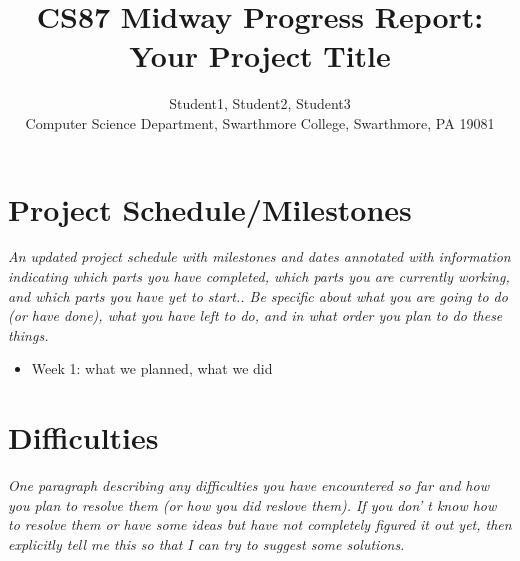 \documentclass[11pt]{article}
\begin{document}
\title{CS87 Midway Progress Report: Your Project Title}

\author{Student1, Student2, Student3 \\
Computer Science Department, Swarthmore College, Swarthmore, PA  19081}

\maketitle

\section{Project Schedule/Milestones}

{\it
An updated project schedule with milestones and dates annotated with
information indicating which parts you have completed, which parts you are
currently working, and which parts you have yet to start.. Be specific about
what you are going to do (or have done), what you have left to do, and in what
order you plan to do these things.}

\begin{itemize}
\item Week 1: what we planned, what we did
\end{itemize}

\section {Difficulties}
{\it
One paragraph describing any difficulties you have encountered so far and how
you plan to resolve them (or how you did reslove them). If you don' t know how
to resolve them or have some ideas but have not completely figured it out yet,
then explicitly tell me this so that I can try to suggest some solutions.}
\end{document}
